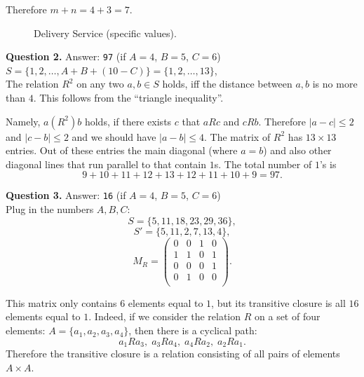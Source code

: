 \documentclass[jou]{apa6}
\begin{document}
Therefore $m+n = 4+3 = 7$.

\begin{figure}[!htb]
\caption{\label{fig:k33-weights-456} Delivery Service (specific values).}
\end{figure}


\vspace{6pt}
{\bf Question 2.} Answer: {\tt 97} (if $A = 4$, $B = 5$, $C = 6$)\\ 
$S = \{ 1,2,\ldots,A + B + (10-C) \} = \{ 1,2,\ldots,13 \}$,\\
The relation $R^2$ on any two $a,b \in S$ holds, iff 
the distance between $a,b$ is no more than $4$.
This follows from the ``triangle inequality''. 

Namely, $a(R^2)b$ holds, if there exists $c$ that $aRc$ and $cRb$. 
Therefore $|a-c| \leq 2$ and $|c-b| \leq 2$ and we should have 
$|a - b| \leq 4$. The matrix of $R^2$ has $13 \times 13$ entries. 
Out of these entries the main diagonal (where $a=b$) and also 
other diagonal lines that run parallel to that contain $1$s.
The total number of $1$'s is 
$$9 + 10 + 11 + 12 + 13 + 12 + 11 + 10 + 9 = 97.$$







\vspace{6pt}
{\bf Question 3.} Answer: {\tt 16} (if $A = 4$, $B = 5$, $C = 6$)\\ 
Plug in the numbers $A,B,C$: 
$$S = \{ 5, 11, 18, 23, 29, 36 \},$$
$$S' = \{ 5, 11, 2, 7, 13, 4 \},$$
$$M_R = \left( \begin{array}{cccc}
0 & 0 & 1 & 0 \\
1 & 1 & 0 & 1 \\
0 & 0 & 0 & 1 \\
0 & 1 & 0 & 0 \\
\end{array} \right).$$

This matrix only contains $6$ elements equal to $1$, but its transitive
closure is all $16$ elements equal to $1$. Indeed, if we consider the relation $R$ 
on a set of four elements: $A = \{ a_1, a_2, a_3, a_4 \}$, then there is a cyclical path: 
$$a_1Ra_3,\;a_3Ra_4,\;a_4Ra_2,\;a_2Ra_1.$$
Therefore the transitive closure is a relation consisting of all pairs of elements $A \times A$. 
\end{document}
